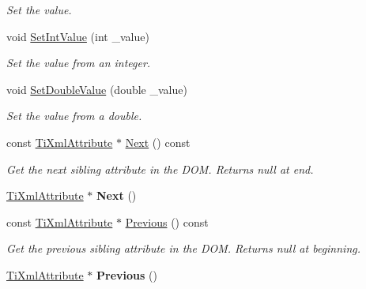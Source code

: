 \begin{DoxyCompactItemize}
\begin{DoxyCompactList}\small\item\em Set the value. \end{DoxyCompactList}\item 
void \hyperlink{classTiXmlAttribute_a7e065df640116a62ea4f4b7da5449cc8}{Set\+Int\+Value} (int \+\_\+value)\hypertarget{classTiXmlAttribute_a7e065df640116a62ea4f4b7da5449cc8}{}\label{classTiXmlAttribute_a7e065df640116a62ea4f4b7da5449cc8}

\begin{DoxyCompactList}\small\item\em Set the value from an integer. \end{DoxyCompactList}\item 
void \hyperlink{classTiXmlAttribute_a0316da31373496c4368ad549bf711394}{Set\+Double\+Value} (double \+\_\+value)\hypertarget{classTiXmlAttribute_a0316da31373496c4368ad549bf711394}{}\label{classTiXmlAttribute_a0316da31373496c4368ad549bf711394}

\begin{DoxyCompactList}\small\item\em Set the value from a double. \end{DoxyCompactList}\item 
const \hyperlink{classTiXmlAttribute}{Ti\+Xml\+Attribute} $\ast$ \hyperlink{classTiXmlAttribute_a776478980776a024f7c2846eec640f65}{Next} () const \hypertarget{classTiXmlAttribute_a776478980776a024f7c2846eec640f65}{}\label{classTiXmlAttribute_a776478980776a024f7c2846eec640f65}

\begin{DoxyCompactList}\small\item\em Get the next sibling attribute in the D\+OM. Returns null at end. \end{DoxyCompactList}\item 
\hyperlink{classTiXmlAttribute}{Ti\+Xml\+Attribute} $\ast$ {\bfseries Next} ()\hypertarget{classTiXmlAttribute_a138320aa7793b148ba7e5bd0a0ea4db6}{}\label{classTiXmlAttribute_a138320aa7793b148ba7e5bd0a0ea4db6}

\item 
const \hyperlink{classTiXmlAttribute}{Ti\+Xml\+Attribute} $\ast$ \hyperlink{classTiXmlAttribute_a54a5f8730c7b02b9a41b74e12e27fe86}{Previous} () const \hypertarget{classTiXmlAttribute_a54a5f8730c7b02b9a41b74e12e27fe86}{}\label{classTiXmlAttribute_a54a5f8730c7b02b9a41b74e12e27fe86}

\begin{DoxyCompactList}\small\item\em Get the previous sibling attribute in the D\+OM. Returns null at beginning. \end{DoxyCompactList}\item 
\hyperlink{classTiXmlAttribute}{Ti\+Xml\+Attribute} $\ast$ {\bfseries Previous} ()\hypertarget{classTiXmlAttribute_ae4dabc932cba945ed1e92fec5f121193}{}\label{classTiXmlAttribute_ae4dabc932cba945ed1e92fec5f121193}


\end{DoxyCompactItemize}
